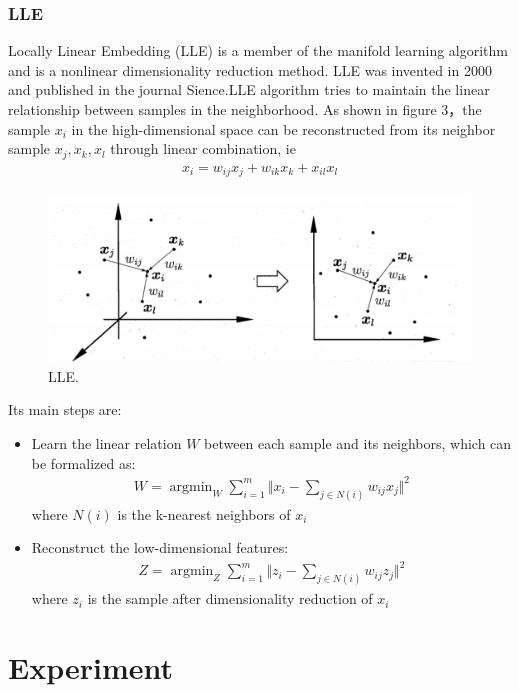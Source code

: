 \documentclass{article}
\begin{document}
\subsubsection{LLE}
Locally Linear Embedding (LLE) is a member of the manifold learning algorithm and is a nonlinear dimensionality reduction method. LLE was invented in 2000 and published in the journal Sience.\cite{roweis2000nonlinear}LLE algorithm tries to maintain the linear relationship between samples in the neighborhood. As shown in figure 3，the sample $x_i$ in the high-dimensional space can be reconstructed from its neighbor sample $x_j,x_k,x_l$ through linear combination, ie
\begin{eqnarray}
x_i = w_{ij}x_j+w_{ik}x_k+x_{il}x_l
\end{eqnarray}
\begin{figure}[htbp]
	\centering
	\includegraphics[scale=0.3]{figures/LLE.png}
	\caption{LLE.}
	\label{fig:LLE}
\end{figure}\par
\indent Its main steps are:
\begin{itemize}
	\item Learn the linear relation $W$ between each sample and its neighbors, which can be formalized as:
	\begin{eqnarray}
	W = \mathop{\arg\min}_{W}\sum_{i=1}^{m}\Vert x_i-\sum_{j\in N(i)}w_{ij}x_j\Vert^2 
	\end{eqnarray}
	where $N(i)$ is the k-nearest neighbors of $x_i$
	
	\item  Reconstruct the low-dimensional features:
	\begin{eqnarray}
	Z = \mathop{\arg\min}_{Z}\sum_{i=1}^{m}\Vert z_i-\sum_{j\in N(i)}w_{ij}z_j\Vert^2 
	\end{eqnarray}
	where $z_i$ is the sample after dimensionality reduction of $x_i$
\end{itemize}

\section{Experiment}
\end{document}
